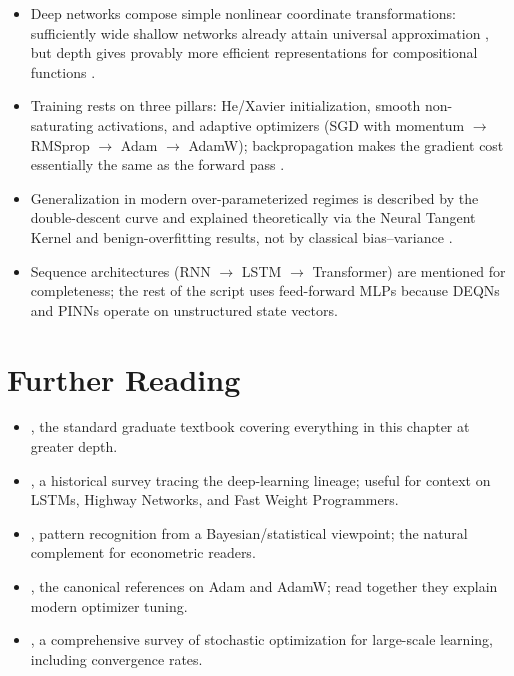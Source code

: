 \documentclass[11pt,a4paper]{report}
\begin{document}
\begin{keyinsightbox}
\label{sec:ch1_summary}
\begin{itemize}[itemsep=2pt, leftmargin=*]
\item Deep networks compose simple nonlinear coordinate transformations: sufficiently wide shallow networks already attain universal approximation \citep{cybenko1989approximation, hornik1989multilayer}, but depth gives provably more efficient representations for compositional functions \citep{telgarsky2016benefits, barron1993universal}.
\item Training rests on three pillars: He/Xavier initialization, smooth non-saturating activations, and adaptive optimizers (SGD with momentum $\to$ RMSprop $\to$ Adam $\to$ AdamW); backpropagation makes the gradient cost essentially the same as the forward pass \citep{rumelhart1986learning, baydin2018automatic}.
\item Generalization in modern over-parameterized regimes is described by the double-descent curve and explained theoretically via the Neural Tangent Kernel and benign-overfitting results, not by classical bias--variance \citep{jacot2018neural, belkin2019reconciling, nakkiran2020deep, bartlett2020benign}.
\item Sequence architectures (RNN $\to$ LSTM $\to$ Transformer) are mentioned for completeness; the rest of the script uses feed-forward MLPs because DEQNs and PINNs operate on unstructured state vectors.
\end{itemize}
\end{keyinsightbox}

\section*{Further Reading}
\begin{itemize}[itemsep=2pt]
\item \citet{goodfellow2016deep}, the standard graduate textbook covering everything in this chapter at greater depth.
\item \citet{schmidhuber2015deep}, a historical survey tracing the deep-learning lineage; useful for context on LSTMs, Highway Networks, and Fast Weight Programmers.
\item \citet{bishop2006}, pattern recognition from a Bayesian/statistical viewpoint; the natural complement for econometric readers.
\item \citet{kingma2015adam, loshchilov2019decoupled}, the canonical references on Adam and AdamW; read together they explain modern optimizer tuning.
\item \citet{bottou2018optimization}, a comprehensive survey of stochastic optimization for large-scale learning, including convergence rates.
\end{itemize}
\end{document}
